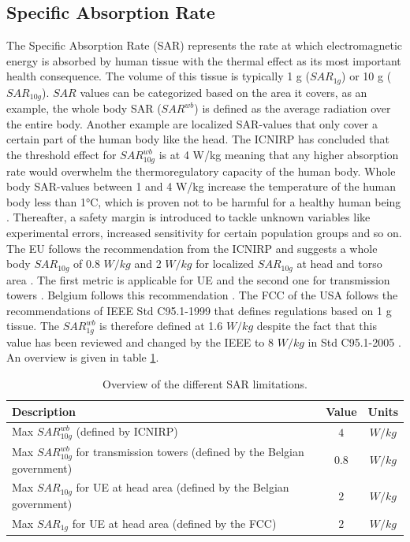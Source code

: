\subsection{Specific Absorption Rate}
The Specific Absorption Rate (\gls{SAR}) represents the rate at which electromagnetic energy is 
absorbed by human tissue with the thermal effect as its most important health consequence.
The volume of this tissue is typically 1 g ($SAR_{1g}$) or 10 g ($SAR_{10g}$). 
$SAR$ values can be categorized based on the area it covers, as an example, 
the whole body \gls{SAR} ($SAR^{wb}$) is defined as the average radiation over the entire body.
Another  example are localized \gls{SAR}-values that only cover a certain part of the human body like the head.
The \gls{ICNIRP} has concluded that the threshold effect for $SAR^{wb}_{10g}$ is at 4 W/kg meaning that any higher absorption 
rate would overwhelm the \gls{thermoregulatory capacity} of the human body.
Whole body \gls{SAR}-values between 1 and 4 W/kg increase the temperature of the human body less than 1°C, which is proven not to be harmful 
for a healthy human being \cite{J24,P2}.
Thereafter, a safety margin is introduced to tackle unknown variables like experimental errors, increased sensitivity for certain population groups and so on. 
The \gls{EU} follows the recommendation from the \gls{ICNIRP} \cite{J23} and 
suggests a whole body $SAR_{10g}$ of 0.8 $W/kg$ and 2 $W/kg$ for localized $SAR_{10g}$ at head and torso area \cite{J31_bioeffects,J30}. 
The first metric is applicable for \gls{UE} and the second one for transmission towers \cite{S20}.
Belgium follows this recommendation \cite{J23, S13_normenBelgie}.
The \gls{FCC} of the \gls{USA} follows the recommendations of \gls{IEEE} Std C95.1-1999 \cite{P1,P2} that defines 
regulations based on 1 g tissue.
The $SAR^{wb}_{1g}$ is therefore defined at 1.6 $W/kg$ despite the fact that this value has been reviewed and changed by the \gls{IEEE} to 8 $W/kg$ in Std C95.1-2005 \cite{P2}.
An overview is given in table \ref{table:overviewSARValues}.

\begin{table}[h!]
\begin{tabular}{|l|c|c|}
\hline
\textbf{Description} & \textbf{Value} & \textbf{Units} \\ \hline
Max $SAR^{wb}_{10g}$ (defined by \gls{ICNIRP})                           &  $4$ & $W/kg$              \\ \hline
Max $SAR^{wb}_{10g}$ for transmission towers (defined by the Belgian government)                & $0.8$ & $W/kg$               \\ \hline
Max $SAR_{10g}$ for \acs{UE} at head area (defined by the Belgian government)                  & $2$ & $W/kg$               \\ \hline
Max $SAR_{1g}$ for \acs{UE} at head area (defined by the \gls{FCC})                  & $2$ & $W/kg$               \\ \hline
\end{tabular}
\caption{Overview of the different \gls{SAR} limitations.}
\label{table:overviewSARValues}
\end{table}


